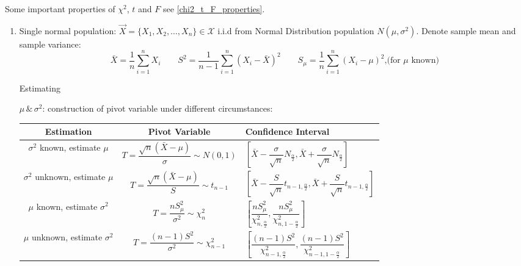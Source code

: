     Some important properties of $\chi^2$, $t$ and $F$ see \autoref{chi2_t_F_properties}.
    \begin{enumerate}
        \item Single normal population: $\vec{X}=\{X_1,X_2,\ldots,X_n\}\in\mathscr{X}$ i.i.d from Normal Distribution population $N(\mu,\sigma^2)$. Denote sample mean and sample variance: 
        \begin{equation}\bar{X}=\frac{1}{n}\sum_{i=1}^nX_i\qquad S^2=\frac{1}{n-1}\sum_{i=1}^n(X_i-\bar{X})^2\qquad S_\mu=\dfrac{1}{n}\sum_{i=1}^n(X_i-\mu)^2\text{,(for }\mu\text{ known)}\end{equation}

        \hypertarget{OneSampletTest}{Estimating} $\mu\,\&\,\sigma^2$: construction of pivot variable under different circumstances:


        \begin{table}[htbp]
            \centering
            \renewcommand\arraystretch{1.9}
            \begin{tabularx}{\linewidth}{|c|c|Y|}
                \hline 
                Estimation& Pivot Variable & Confidence Interval\\
                \hline
                $\sigma^2$ known, estimate $\mu$    &   $T=\dfrac{\sqrt{n}(\bar{X}-\mu)}{\sigma}\sim N(0,1)$ & $\left[ \bar{X}-\dfrac{\sigma}{\sqrt{n}}N_\frac{\alpha}{2},\bar{X}+\dfrac{\sigma}{\sqrt{n}}N_\frac{\alpha}{2} \right]$\\
                \hline
                $\sigma^2$ unknown, estimate $\mu$&$T=\dfrac{\sqrt{n}(\bar{X}-\mu)}{S}\sim t_{n-1}$&$\left[\bar{X}-\dfrac{S}{\sqrt{n}}t_{n-1,\frac{\alpha}{2}},\bar{X}+\dfrac{S}{\sqrt{n}}t_{n-1,\frac{\alpha}{2}}\right]$\\
                \hline
                $\mu$ known, estimate $\sigma^2$&$T=\dfrac{nS_\mu^2}{\sigma^2}\sim\chi_n^2$&$\left[\dfrac{nS^2_\mu}{\chi^2_{n,\frac{\alpha}{2}}},\dfrac{nS^2_\mu}{\chi^2_{n,1-\frac{\alpha}{2}}}\right]$\\
                \hline
                $\mu$ unknown, estimate $\sigma^2$&$T=\dfrac{(n-1)S^2}{\sigma^2}\sim\chi^2_{n-1} $&$\left[\dfrac{(n-1)S^2}{\chi^2_{n-1,\frac{\alpha}{2}}},\dfrac{(n-1)S^2}{\chi^2_{n-1,1-\frac{\alpha}{2}}}\right]$\\
                \hline
            \end{tabularx}
        \end{table}


\end{enumerate}
